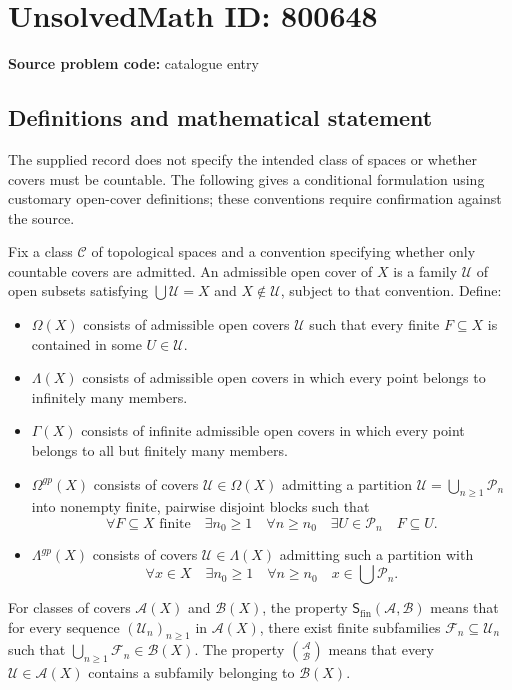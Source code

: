 \documentclass[11pt]{article}
\begin{document}
\section*{UnsolvedMath ID: 800648}
\textbf{Source problem code:} catalogue entry
\subsection{Definitions and mathematical statement}
The supplied record does not specify the intended class of spaces or whether covers must be countable. The following gives a conditional formulation using customary open-cover definitions; these conventions require confirmation against the source.

Fix a class \(\mathcal C\) of topological spaces and a convention specifying whether only countable covers are admitted. An admissible open cover of \(X\) is a family \(\mathcal U\) of open subsets satisfying \(\bigcup\mathcal U=X\) and \(X\notin\mathcal U\), subject to that convention. Define:
\begin{itemize}
\item \(\Omega(X)\) consists of admissible open covers \(\mathcal U\) such that every finite \(F\subseteq X\) is contained in some \(U\in\mathcal U\).
\item \(\Lambda(X)\) consists of admissible open covers in which every point belongs to infinitely many members.
\item \(\Gamma(X)\) consists of infinite admissible open covers in which every point belongs to all but finitely many members.
\item \(\Omega^{gp}(X)\) consists of covers \(\mathcal U\in\Omega(X)\) admitting a partition \(\mathcal U=\bigcup_{n\geq1}\mathcal P_n\) into nonempty finite, pairwise disjoint blocks such that
\[
\forall F\subseteq X\text{ finite}\quad
\exists n_0\geq1\quad
\forall n\geq n_0\quad
\exists U\in\mathcal P_n\quad F\subseteq U.
\]
\item \(\Lambda^{gp}(X)\) consists of covers \(\mathcal U\in\Lambda(X)\) admitting such a partition with
\[
\forall x\in X\quad\exists n_0\geq1\quad
\forall n\geq n_0\quad x\in\bigcup\mathcal P_n.
\]
\end{itemize}
For classes of covers \(\mathscr A(X)\) and \(\mathscr B(X)\), the property \(\mathsf S_{\mathrm{fin}}(\mathscr A,\mathscr B)\) means that for every sequence \((\mathcal U_n)_{n\geq1}\) in \(\mathscr A(X)\), there exist finite subfamilies \(\mathcal F_n\subseteq\mathcal U_n\) such that \(\bigcup_{n\geq1}\mathcal F_n\in\mathscr B(X)\). The property \(\binom{\mathscr A}{\mathscr B}\) means that every \(\mathcal U\in\mathscr A(X)\) contains a subfamily belonging to \(\mathscr B(X)\).
\end{document}
